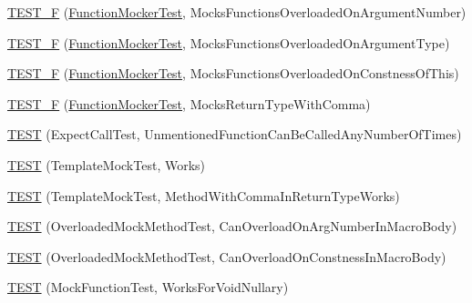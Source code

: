 \begin{DoxyCompactItemize}
\item 
\hyperlink{namespacetesting_1_1gmock__generated__function__mockers__test_a23b4f6d7bf9f6b35126ee137aa48ae3b}{T\+E\+S\+T\+\_\+F} (\hyperlink{classtesting_1_1gmock__generated__function__mockers__test_1_1FunctionMockerTest}{Function\+Mocker\+Test}, Mocks\+Functions\+Overloaded\+On\+Argument\+Number)
\item 
\hyperlink{namespacetesting_1_1gmock__generated__function__mockers__test_a6fb9a5901e2d2066a9fe5a3d05c0cbe1}{T\+E\+S\+T\+\_\+F} (\hyperlink{classtesting_1_1gmock__generated__function__mockers__test_1_1FunctionMockerTest}{Function\+Mocker\+Test}, Mocks\+Functions\+Overloaded\+On\+Argument\+Type)
\item 
\hyperlink{namespacetesting_1_1gmock__generated__function__mockers__test_ad580a4b2f97b3c2643794a627b347511}{T\+E\+S\+T\+\_\+F} (\hyperlink{classtesting_1_1gmock__generated__function__mockers__test_1_1FunctionMockerTest}{Function\+Mocker\+Test}, Mocks\+Functions\+Overloaded\+On\+Constness\+Of\+This)
\item 
\hyperlink{namespacetesting_1_1gmock__generated__function__mockers__test_abb74ac8e211661c0d87c902f87002e6d}{T\+E\+S\+T\+\_\+F} (\hyperlink{classtesting_1_1gmock__generated__function__mockers__test_1_1FunctionMockerTest}{Function\+Mocker\+Test}, Mocks\+Return\+Type\+With\+Comma)
\item 
\hyperlink{namespacetesting_1_1gmock__generated__function__mockers__test_ae0d5aa8e715f3c183f1ccdcf390187e7}{T\+E\+ST} (Expect\+Call\+Test, Unmentioned\+Function\+Can\+Be\+Called\+Any\+Number\+Of\+Times)
\item 
\hyperlink{namespacetesting_1_1gmock__generated__function__mockers__test_a5f59a7b507101fc0dbb558c090974f02}{T\+E\+ST} (Template\+Mock\+Test, Works)
\item 
\hyperlink{namespacetesting_1_1gmock__generated__function__mockers__test_aa998c7e5e8b6fd378cacb53663e8c4a6}{T\+E\+ST} (Template\+Mock\+Test, Method\+With\+Comma\+In\+Return\+Type\+Works)
\item 
\hyperlink{namespacetesting_1_1gmock__generated__function__mockers__test_a6542d3ae3f153907c32f3cf15a2ff6cf}{T\+E\+ST} (Overloaded\+Mock\+Method\+Test, Can\+Overload\+On\+Arg\+Number\+In\+Macro\+Body)
\item 
\hyperlink{namespacetesting_1_1gmock__generated__function__mockers__test_aa58ec93a77bee21244c10da2bc8cf70e}{T\+E\+ST} (Overloaded\+Mock\+Method\+Test, Can\+Overload\+On\+Constness\+In\+Macro\+Body)
\item 
\hyperlink{namespacetesting_1_1gmock__generated__function__mockers__test_a8d67aadbc04fee7e2afc10ee91a76b74}{T\+E\+ST} (Mock\+Function\+Test, Works\+For\+Void\+Nullary)

\end{DoxyCompactItemize}
